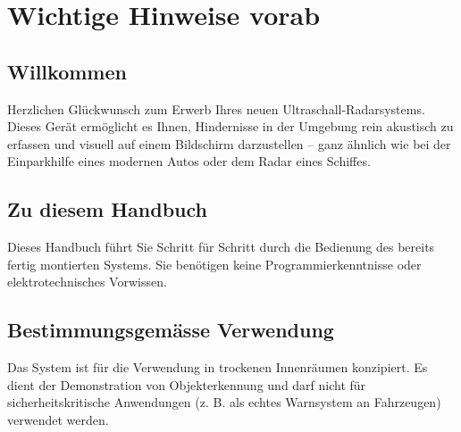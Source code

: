 %
%
%



\chapter{Wichtige Hinweise vorab}

\section{Willkommen}
Herzlichen Glückwunsch zum Erwerb Ihres neuen Ultraschall-Radarsystems. Dieses Gerät ermöglicht es Ihnen, Hindernisse in der Umgebung rein akustisch zu erfassen und visuell auf einem Bildschirm darzustellen – ganz ähnlich wie bei der Einparkhilfe eines modernen Autos oder dem Radar eines Schiffes.

\section{Zu diesem Handbuch}
Dieses Handbuch führt Sie Schritt für Schritt durch die Bedienung des bereits fertig montierten Systems. Sie benötigen keine Programmierkenntnisse oder elektrotechnisches Vorwissen. 

\section{Bestimmungsgemässe Verwendung}
Das System ist für die Verwendung in trockenen Innenräumen konzipiert. Es dient der Demonstration von Objekterkennung und darf nicht für sicherheitskritische Anwendungen (z. B. als echtes Warnsystem an Fahrzeugen) verwendet werden.
